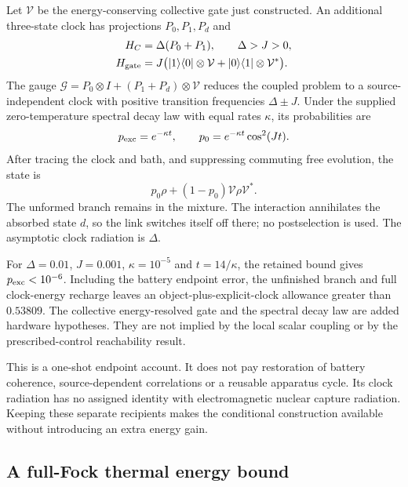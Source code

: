Let $\mathcal V$ be the energy-conserving collective gate just constructed.
An additional three-state clock has projections $P_0,P_1,P_d$ and
\begin{align}
H_C&=\Delta(P_0+P_1),\qquad \Delta>J>0,\\
H_{\rm gate}&=J\bigl(|1\rangle\langle0|\otimes\mathcal V
+|0\rangle\langle1|\otimes\mathcal V^*\bigr).
\end{align}
The gauge
$\mathcal G=P_0\otimes I+(P_1+P_d)\otimes\mathcal V$
reduces the coupled problem to a source-independent clock with positive
transition frequencies $\Delta\pm J$. Under the supplied zero-temperature
spectral decay law with equal rates $\kappa$, its probabilities are
\begin{equation}
p_{\rm exc}=e^{-\kappa t},\qquad
p_0=e^{-\kappa t}\cos^2(Jt).
\end{equation}
After tracing the clock and bath, and suppressing commuting free evolution,
the state is
\begin{equation}
p_0\rho+(1-p_0)\mathcal V\rho\mathcal V^*.
\end{equation}
The unformed branch remains in the mixture. The interaction annihilates
the absorbed state $d$, so the link switches itself off there; no
postselection is used. The asymptotic clock radiation is $\Delta$.

For $\Delta=0.01$, $J=0.001$, $\kappa=10^{-5}$ and $t=14/\kappa$,
the retained bound gives $p_{\rm exc}<10^{-6}$. Including the battery
endpoint error, the unfinished branch and full clock-energy recharge leaves
an object-plus-explicit-clock allowance greater than $0.53809$. The
collective energy-resolved gate and the spectral decay law are added
hardware hypotheses. They are not implied by the local scalar coupling or
by the prescribed-control reachability result.

This is a one-shot endpoint account. It does not pay restoration of battery
coherence, source-dependent correlations or a reusable apparatus cycle.
Its clock radiation has no assigned identity with electromagnetic nuclear
capture radiation. Keeping these separate recipients makes the conditional
construction available without introducing an extra energy gain.

\subsection{A full-Fock thermal energy bound}
\label{app:thermal-new}

